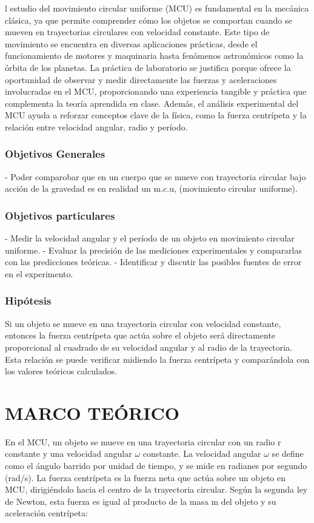 \documentclass[journal]{IEEEtran}
\begin{document}
l estudio del movimiento circular uniforme (MCU) es fundamental en la mecánica clásica, ya que permite comprender cómo los objetos se comportan cuando se mueven en trayectorias circulares con velocidad constante. Este tipo de movimiento se encuentra en diversas aplicaciones prácticas, desde el funcionamiento de motores y maquinaria hasta fenómenos astronómicos como la órbita de los planetas. La práctica de laboratorio se justifica porque ofrece la oportunidad de observar y medir directamente las fuerzas y aceleraciones involucradas en el MCU, proporcionando una experiencia tangible y práctica que complementa la teoría aprendida en clase. Además, el análisis experimental del MCU ayuda a reforzar conceptos clave de la física, como la fuerza centrípeta y la relación entre velocidad angular, radio y período.\\

\subsubsection{Objetivos Generales}

 - Poder comparobar que en un cuerpo que se mueve con trayectoria circular bajo acción de la gravedad es en realidad un m.c.u, (movimiento circular uniforme).\\

\subsubsection{Objetivos particulares}
- Medir la velocidad angular y el período de un objeto en movimiento circular uniforme.
- Evaluar la precisión de las mediciones experimentales y compararlas con las predicciones teóricas.
- Identificar y discutir las posibles fuentes de error en el experimento.
\subsubsection{Hipótesis}
Si un objeto se mueve en una trayectoria circular con velocidad constante, entonces la fuerza centrípeta que actúa sobre el objeto será directamente proporcional al cuadrado de su velocidad angular y al radio de la trayectoria. Esta relación se puede verificar midiendo la fuerza centrípeta y comparándola con los valores teóricos calculados.
\\


\section{MARCO TEÓRICO}
En el MCU, un objeto se mueve en una trayectoria circular con un radio r constante y una velocidad angular \(\omega\) constante. La velocidad angular \(\omega\) se define como el ángulo barrido por unidad de tiempo, y se mide en radianes por segundo (rad/s).
La fuerza centrípeta es la fuerza neta que actúa sobre un objeto en MCU, dirigiéndolo hacia el centro de la trayectoria circular. Según la segunda ley de Newton, esta fuerza es igual al producto de la masa 
m del objeto y su aceleración centrípeta:
\end{document}
